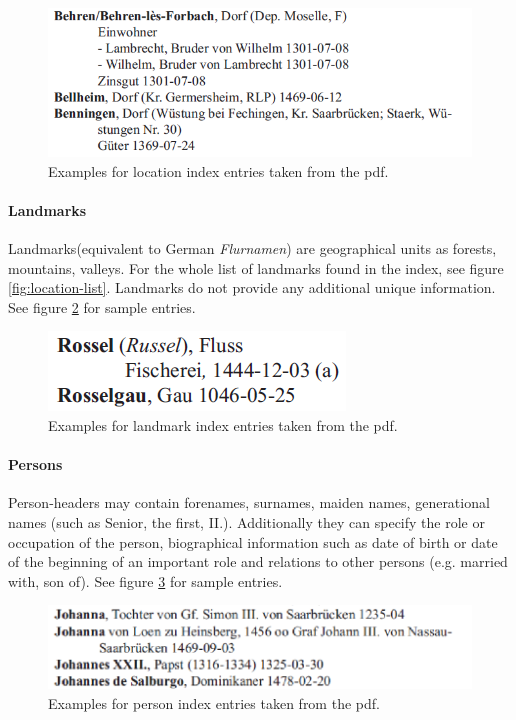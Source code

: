 \begin{figure}[h]
  \centering
  \includegraphics[scale=0.45]{img/location-example}
  \caption{Examples for location index entries taken from the pdf.}
  \label{fig:location-example}
\end{figure}

\paragraph{Landmarks}
Landmarks(equivalent to German \textit{Flurnamen}) are geographical units as forests, mountains, valleys. For the whole list of landmarks found in the index, see figure \ref{fig:location-list}. Landmarks do not provide any additional unique information. See figure \ref{fig:landmark-example} for sample entries.

\begin{figure}[h]
  \centering
  \includegraphics[scale=0.45]{img/landmark-example}
  \caption{Examples for landmark index entries taken from the pdf.}
  \label{fig:landmark-example}
\end{figure}

\paragraph{Persons}
Person-headers may contain forenames, surnames, maiden names, generational names (such as Senior, the first, II.). Additionally they can specify the role or occupation of the person, biographical information such as date of birth or date of the beginning of an important role and relations to other persons (e.g. married with, son of). See figure \ref{fig:person-example} for sample entries.
\begin{figure}[h]
  \centering
  \includegraphics[scale=0.45]{img/person-example}
  \caption{Examples for person index entries taken from the pdf.}
  \label{fig:person-example}
\end{figure}

